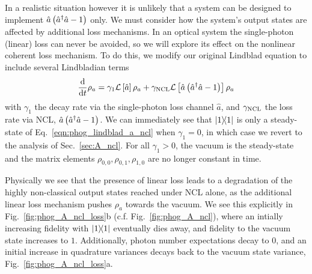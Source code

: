 In a realistic situation however it is unlikely that a system can be designed to implement $\hat{a}\left(\hat{a}^\dagger \hat{a} - 1\right)$ only. We must consider how the system's output states are affected by additional loss mechanisms. In an optical system the single-photon (linear) loss can never be avoided, so we will explore its effect on the nonlinear coherent loss mechanism. To do this, we modify our original Lindblad equation to include several Lindbladian terms
\begin{equation}\label{eqn:phog_lindblad_a_ncl}
\frac{\mathrm{d}}{\mathrm{d}t} \rho_a =  \gamma_1 \mathcal{L}\left[\hat{a}\right]\rho_a + \gamma_{\text{NCL}} \mathcal{L}\left[\hat{a}\left(\hat{a}^\dagger \hat{a} - 1\right)\right]\rho_a
\end{equation}
with $\gamma_1$ the decay rate via the single-photon loss channel $\hat{a}$, and $\gamma_{\text{NCL}}$ the loss rate via NCL, $\hat{a}\left(\hat{a}^\dagger \hat{a} - 1\right)$. We can immediately see that $\dyad{1}$ is only a steady-state of Eq.~\ref{eqn:phog_lindblad_a_ncl} when $\gamma_1 = 0$, in which case we revert to the analysis of Sec.~\ref{sec:A_ncl}. For all $\gamma_1 > 0$, the vacuum is the steady-state and the matrix elements $\rho_{0, 0}, \rho_{0, 1}, \rho_{1, 0}$ are no longer constant in time. 

Physically we see that the presence of linear loss leads to a degradation of the highly non-classical output states reached under NCL alone, as the additional linear loss mechanism pushes $\rho_a$ towards the vacuum. We see this explicitly in Fig.~\ref{fig:phog_A_ncl_loss}b (c.f. Fig.~\ref{fig:phog_A_ncl}), where an intially increasing fidelity with $\dyad{1}$ eventually dies away, and fidelity to the vacuum state increases to $1$. Additionally, photon number expectations decay to $0$, and an initial increase in quadrature variances decays back to the vacuum state variance, Fig.~\ref{fig:phog_A_ncl_loss}a.





